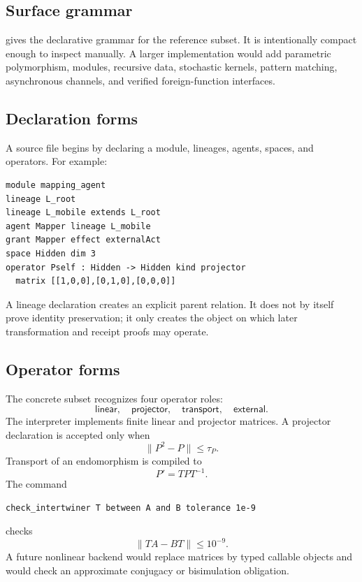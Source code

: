 \subsection{Surface grammar}

 gives the declarative grammar for the reference subset.  It
is intentionally compact enough to inspect manually.  A larger implementation
would add parametric polymorphism, modules, recursive data, stochastic kernels,
pattern matching, asynchronous channels, and verified foreign-function
interfaces.



\subsection{Declaration forms}

A source file begins by declaring a module, lineages, agents, spaces, and
operators.  For example:
\begin{lstlisting}[style=osl]
module mapping_agent
lineage L_root
lineage L_mobile extends L_root
agent Mapper lineage L_mobile
grant Mapper effect externalAct
space Hidden dim 3
operator Pself : Hidden -> Hidden kind projector
  matrix [[1,0,0],[0,1,0],[0,0,0]]
\end{lstlisting}
A lineage declaration creates an explicit parent relation.  It does not by
itself prove identity preservation; it only creates the object on which later
transformation and receipt proofs may operate.

\subsection{Operator forms}

The concrete subset recognizes four operator roles:
\[
\mathsf{linear},\quad
\mathsf{projector},\quad
\mathsf{transport},\quad
\mathsf{external}.
\]
The interpreter implements finite linear and projector matrices.  A projector
declaration is accepted only when
\[
\|P^2-P\|\leq\tau_P.
\]
Transport of an endomorphism is compiled to
\[
P'=TPT^{-1}.
\]
The command
\begin{lstlisting}[style=osl]
check_intertwiner T between A and B tolerance 1e-9
\end{lstlisting}
checks
\[
\|TA-BT\|\leq 10^{-9}.
\]
A future nonlinear backend would replace matrices by typed callable objects and
would check an approximate conjugacy or bisimulation obligation.

